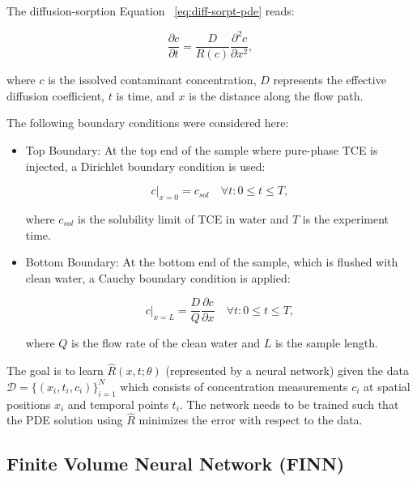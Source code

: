 The diffusion-sorption Equation ~\vref{eq:diff-sorpt-pde} reads:

\begin{equation}
    \frac{\partial c}{\partial t} = \frac{D}{R(c)} \frac{\partial^2 c}{\partial x^2},
    \label{eq:diff-sorpt-pde}
\end{equation}

where $c$ is the issolved contaminant concentration, $D$ represents the effective diffusion coefficient, $t$ is time, and $x$ is the distance along the flow path.

The following boundary conditions were considered here:

\begin{itemize}
    \item Top Boundary: At the top end of the sample where pure-phase TCE is injected, a Dirichlet boundary condition is used:

    \begin{equation}
        c|_{x=0} = c_{sol} \quad \forall t : 0 \leq t \leq T,
    \end{equation}

    where $c_{sol}$ is the solubility limit of TCE in water and $T$ is the experiment time.

    \item Bottom Boundary: At the bottom end of the sample, which is flushed with clean water, a Cauchy boundary condition is applied:

    \begin{equation}
        c|_{x=L} = \frac{D}{Q} \frac{\partial c}{\partial x} \quad \forall t : 0 \leq t \leq T,
    \end{equation}

    where $Q$ is the flow rate of the clean water and $L$ is the sample length.
\end{itemize}

The goal is to learn $\hat{R}(x,t;\theta)$ (represented by a neural network) given the data $\mathcal{D} = \{ (x_i, t_i, c_i) \}_{i=1}^N$ which consists of concentration measurements $c_i$ at spatial positions $x_i$ and temporal points $t_i$. The network needs to be trained such that the PDE solution using $\hat{R}$ minimizes the error with respect to the data.




\subsection{Finite Volume Neural Network (FINN)}

